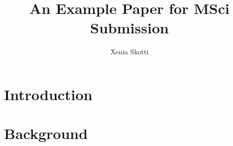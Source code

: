 \documentclass{mpaper}
\begin{document}
\title{An Example Paper for MSci Submission}
\author{Xenia Skotti}

\maketitle

\begin{abstract}

\end{abstract}

\section{Introduction}



\section{Background}
\end{document}
